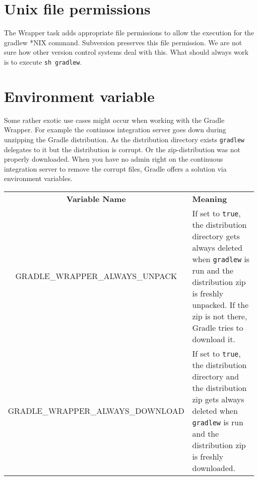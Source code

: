 \section{Unix file permissions} %
\label{sec:unix_file_permissions}
The Wrapper task adds appropriate file permissions to allow the execution for the gradlew *NIX command. Subversion preserves this file permission. We are not sure how other version control systems deal with this. What should always work is to execute \texttt{sh gradlew}. 


\section{Environment variable} %
\label{sec:environment_variable}
Some rather exotic use cases might occur when working with the Gradle Wrapper. For example the continuos integration server goes down during unzipping the Gradle distribution. As the distribution directory exists \texttt{gradlew} delegates to it but the distribution is corrupt. Or the zip-distribution was not properly downloaded. When you have no admin right on the continuous integration server to remove the corrupt files, Gradle offers a solution via environment variables.

\begin{tabularx}{\textwidth}{cX} 
	\textbf{Variable Name} & \centerline{\textbf{Meaning}}\\
    GRADLE\_WRAPPER\_ALWAYS\_UNPACK & If set to \texttt{true}, the distribution directory gets always deleted when \texttt{gradlew} is run and the distribution zip is freshly unpacked. If the zip is not there, Gradle tries to download it. \\
	GRADLE\_WRAPPER\_ALWAYS\_DOWNLOAD & If set to \texttt{true}, the distribution directory and the distribution zip gets always deleted when \texttt{gradlew} is run and the distribution zip is freshly downloaded. \\
\end{tabularx}
